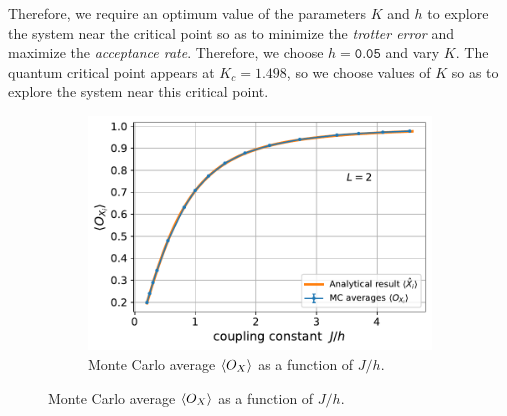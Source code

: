 \documentclass[../thesis_main.tex]{subfiles}
\begin{document}
Therefore, we require an optimum value of the parameters $K$ and $h$ to explore the system near the critical point so as to minimize the \textit{trotter error} and maximize the \textit{acceptance rate}. Therefore, we choose $h = \texttt{0.05}$ and vary $K$. The quantum critical point appears at $K_c = 1.498$, so we choose values of $K$ so as to explore the system near this critical point.    

\begin{figure}[!htb]
    \centering
    \begin{subfigure}[b]{0.6\textwidth}
        \centering
        \includegraphics[width=\textwidth]{images/2_site/O_X.pdf}
        \caption{Monte Carlo average $\expval{O_X}$ as a function of $J/h$.}
        \label{expval_O_X_vs_J/h_2}
    \end{subfigure}
\end{figure}
\end{document}
